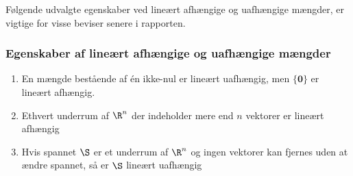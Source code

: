 %
Følgende udvalgte egenskaber ved lineært afhængige og uafhængige mængder, er vigtige for visse beviser senere i rapporten.
\subsubsection{Egenskaber af lineært afhængige og uafhængige mængder}\label{egenskab_lin}
\begin{enumerate}
\item En mængde bestående af én ikke-nul er lineært uafhængig, men $\{\textbf{0}\}$ er lineært afhængig.
\item Ethvert underrum af $\R^n$ der indeholder mere end $n$ vektorer er lineært afhængig
\item Hvis spannet $\S$ er et underrum af $\R^n$ og ingen vektorer kan fjernes uden at ændre spannet, så er $\S$ lineært uafhængig

\end{enumerate}

